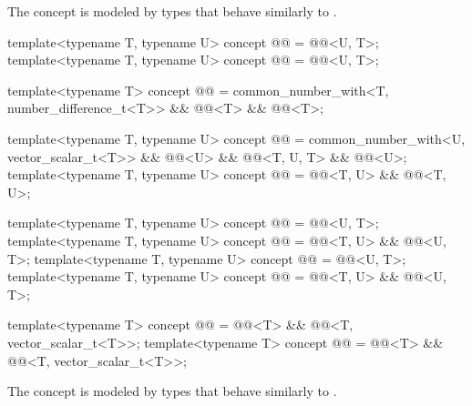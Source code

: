 \begin{itemdescr}
\pnum
\begin{note}
The  concept is modeled by types
that behave similarly to .
\end{note}
\end{itemdescr}

\begin{itemdecl}
template<typename T, typename U>
concept @@ = @@<U, T>;
template<typename T, typename U>
concept @@ = @@<U, T>;

template<typename T>
concept @@ =
  common_number_with<T, number_difference_t<T>> && @@<T> && @@<T>;

template<typename T, typename U>
concept @@ = common_number_with<U, vector_scalar_t<T>> && @@<U> &&
                      @@<T, U, T> && @@<U>;
template<typename T, typename U>
concept @@ = @@<T, U> && @@<T, U>;

template<typename T, typename U>
concept @@ = @@<U, T>;
template<typename T, typename U>
concept @@ = @@<T, U> && @@<U, T>;
template<typename T, typename U>
concept @@ = @@<U, T>;
template<typename T, typename U>
concept @@ = @@<T, U> && @@<U, T>;

template<typename T>
concept @@ = @@<T> && @@<T, vector_scalar_t<T>>;
template<typename T>
concept @@ = @@<T> && @@<T, vector_scalar_t<T>>;
\end{itemdecl}

\begin{itemdescr}
\pnum
\begin{note}
The  concept is modeled by types
that behave similarly to .
\end{note}
\end{itemdescr}

